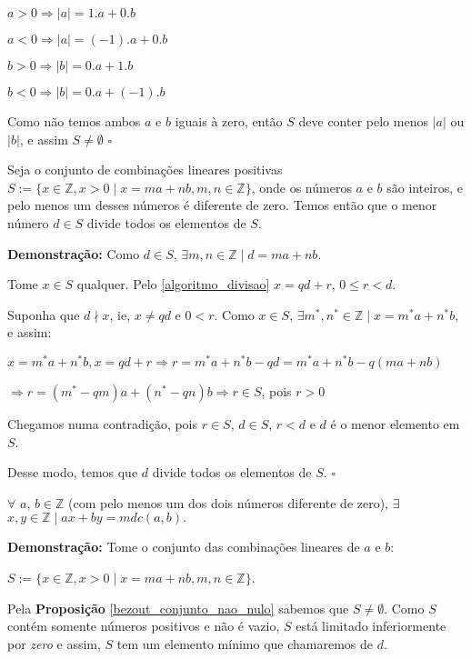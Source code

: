 $a > 0 \Rightarrow |a| = 1.a + 0.b$

$a < 0 \Rightarrow |a| = (-1).a + 0.b$

$b > 0 \Rightarrow |b| = 0.a + 1.b$

$b < 0 \Rightarrow |b| = 0.a + (-1).b$

Como não temos ambos $a$ e $b$ iguais à zero, então $S$ deve conter pelo menos $|a|$ ou $|b|$, e assim $S \neq \emptyset$ $\square$


\begin{corollary}\label{bezout_conjunto_divide}
Seja o conjunto de combinações lineares positivas $S := \{x\in\mathbb{Z}, x>0 \mid x = ma + nb, m,n\in \mathbb{Z}\}$, onde os números $a$ e $b$ são inteiros, 
e pelo menos um desses números é diferente de zero. Temos então que o menor número $d \in S$ divide todos os elementos de $S$.
\end{corollary}
\textbf{Demonstração:}
Como $d \in S$, $\exists m,n\in\mathbb{Z} \mid d = ma + nb$.

Tome $x \in S$ qualquer. Pelo \autoref{algoritmo_divisao} $x = qd + r$, $0 \leq r < d$.

Suponha que $d\nmid x$, ie, $x \neq qd$ e $0 < r$. Como $x \in S$, $\exists m^*,n^*\in\mathbb{Z} \mid x = m^*a + n^*b$, e assim:

$x = m^*a + n^*b, x = qd + r \Rightarrow r = m^*a + n^*b - qd = m^*a + n^*b - q(ma + nb)$ 

$\Rightarrow r = (m^* - qm)a + (n^* - qn)b \Rightarrow r \in S$, pois $r > 0$

Chegamos numa contradição, pois $r \in S$, $d \in S$, $r < d$ e $d$ é o menor elemento em $S$.

Desse modo, temos que $d$ divide todos os elementos de $S$. $\square$


\begin{theorem}\label{teorema_bezout}
$\forall$ $a$, $b \in \mathbb{Z}$ (com pelo menos um dos dois números diferente de zero), $\exists$ $x, y \in \mathbb{Z} \mid ax + by = mdc(a, b).$
\end{theorem}
\textbf{Demonstração:}
Tome o conjunto das combinações lineares de $a$ e $b$:

$S := \{x\in\mathbb{Z}, x>0 \mid x = ma + nb, m,n\in \mathbb{Z}\}$.

Pela \textbf{Proposição} \autoref{bezout_conjunto_nao_nulo} sabemos que $S \neq \emptyset$. Como $S$ contém somente números positivos e não é vazio, 
$S$ está limitado inferiormente por \textit{zero} e assim, $S$ tem um elemento mínimo que chamaremos de $d$.

